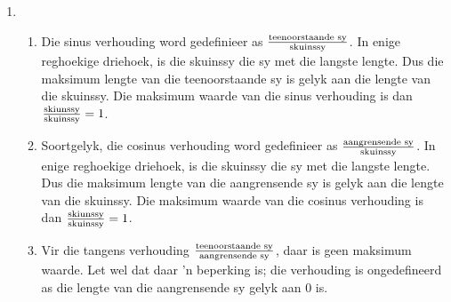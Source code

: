 \begin{solutions}{}
{\begin{enumerate}[itemsep=7pt, label=\textbf{\arabic*}. ]
\begin{multicols}{2}
\end{multicols}
\item %
\begin{enumerate}[noitemsep, label=\textbf{(\alph*)} ]
 \item  Die sinus verhouding word gedefinieer as $$.  In enige reghoekige driehoek, is die skuinssy die sy met die langste lengte. Dus die maksimum lengte van die teenoorstaande sy is gelyk aan die lengte van die skuinssy. Die maksimum waarde van die sinus verhouding is dan $=1$.
 \item Soortgelyk, die cosinus verhouding word gedefinieer as $$. In enige reghoekige driehoek, is die skuinssy die sy met die langste lengte. Dus die maksimum lengte van die aangrensende sy is gelyk aan die lengte van die skuinssy. Die maksimum waarde van die cosinus verhouding is dan $=1$.
 \item Vir die tangens verhouding $$, daar is geen maksimum waarde. Let wel dat daar 'n beperking is; die verhouding is ongedefineerd as die lengte van die aangrensende sy gelyk aan $0$ is.



 \end{enumerate}
\end{enumerate}}
\end{solutions}

